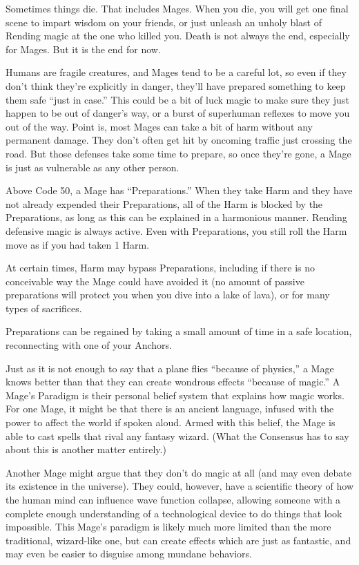 \documentclass[letterpaper,12pt]{article}
\newcommand{\SECTION}[1]{\vspace{.5em}{\noindent\titlefont\large\textbf{#1}}

}
\begin{document}
\SECTION{Death}
Sometimes things die. That includes Mages. When you die, you will get
one final scene to impart wisdom on your friends, or just unleash an
unholy blast of Rending magic at the one who killed you. Death is not
always the end, especially for Mages. But it is the end for now.

\SECTION{Magical Preparations}
Humans are fragile creatures, and Mages tend to be a careful lot, so
even if they don't think they're explicitly in danger, they'll have
prepared something to keep them safe ``just in case.'' This could be a
bit of luck magic to make sure they just happen to be out of danger's
way, or a burst of superhuman reflexes to move you out of the
way. Point is, most Mages can take a bit of harm without any permanent
damage. They don't often get hit by oncoming traffic just crossing the
road. But those defenses take some time to prepare, so once they're
gone, a Mage is just as vulnerable as any other person.

Above Code 50, a Mage has ``Preparations.'' When they take Harm and
they have not already expended their Preparations, all of the Harm is
blocked by the Preparations, as long as this can be explained in a
harmonious manner. Rending defensive magic is always active. Even with
Preparations, you still roll the Harm move as if you had taken 1 Harm.

At certain times, Harm may bypass Preparations, including if there is
no conceivable way the Mage could have avoided it (no amount of
passive preparations will protect you when you dive into a lake of
lava), or for many types of sacrifices.

Preparations can be regained by taking a small amount of time in a
safe location, reconnecting with one of your Anchors.

\SECTION{Paradigm}
Just as it is not enough to say that a plane flies ``because of
physics,'' a Mage knows better than that they can create wondrous
effects ``because of magic.'' A Mage's Paradigm is their personal
belief system that explains how magic works. For one Mage, it might be
that there is an ancient language, infused with the power to affect
the world if spoken aloud. Armed with this belief, the Mage is able to
cast spells that rival any fantasy wizard. (What the Consensus has to
say about this is another matter entirely.)

Another Mage might argue that they don't do magic at all (and may even
debate its existence in the universe). They could, however, have a
scientific theory of how the human mind can influence wave function
collapse, allowing someone with a complete enough understanding of a
technological device to do things that look impossible. This Mage's
paradigm is likely much more limited than the more traditional,
wizard-like one, but can create effects which are just as fantastic,
and may even be easier to disguise among mundane behaviors.
\end{document}
